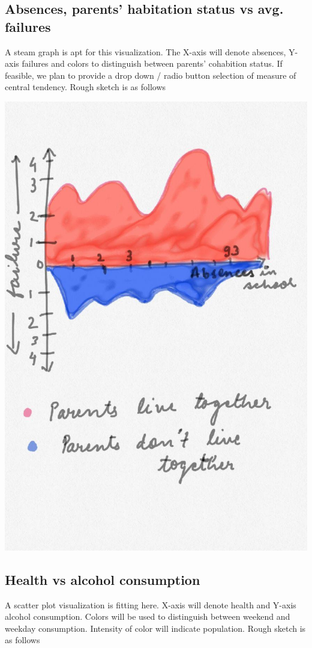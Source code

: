 \documentclass[titlepage, 12pt]{article}
\begin{document}
\subsection{Absences, parents' habitation status vs avg. failures}
A steam graph is apt for this visualization. The X-axis will denote absences,
Y-axis failures and colors to distinguish between parents' cohabition status. If
feasible, we plan to provide a drop down / radio button selection of measure of
central tendency. Rough sketch is as follows

\begin{center}
\includegraphics[scale=0.3]{5}
\end{center}

\subsection{Health vs alcohol consumption}
A scatter plot visualization is fitting here. X-axis will denote health and
Y-axis alcohol consumption. Colors will be used to distinguish between weekend
and weekday consumption. Intensity of color will indicate population. Rough
sketch is as follows
\end{document}
